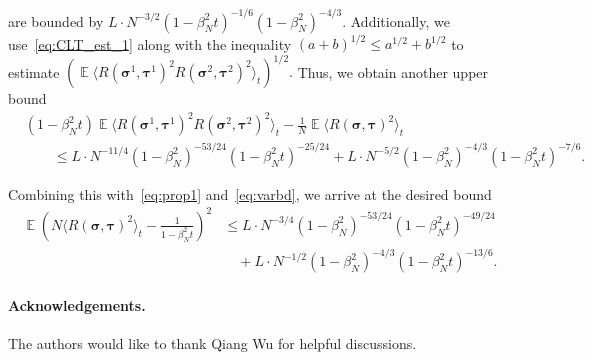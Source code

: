 \documentclass[letterpaper,11pt,reqno]{amsart}
\renewcommand{\leq}{\leqslant}
\newcommand{\ra}{\rangle}
\newcommand{\la}{\langle}
\newcommand{\mvgs}{\boldsymbol{\sigma}}\newcommand{\mvgS}{\boldsymbol{\Sigma}}\newcommand{\mvgt}{\boldsymbol{\tau}}
\DeclareMathOperator{\E}{\mathds{E}}
\begin{document}
are bounded by \(L \cdot N^{-3/2} (1-\beta_N^2 t)^{-1/6} (1-\beta_N^2)^{-4/3}\).
Additionally, we use~\eqref{eq:CLT_est_1} along with the inequality \((a+b)^{1/2} \leq a^{1/2} + b^{1/2}\) to estimate 
\(
\left(\E \la R(\mvgs^1, \mvgt^1)^2 R(\mvgs^2, \mvgt^2)^2  \ra_{t} \right)^{1/2}.
\)
Thus, we obtain another upper bound
\begin{align}
    &(1- \beta_N^2 t) \E \la R(\mvgs^1, \mvgt^1)^2 R(\mvgs^2, \mvgt^2)^2 \ra_{t} - \frac{1}{N} \E \la R(\mvgs, \mvgt)^2 \ra_{t}  \nonumber \\
    &\qquad\leq L \cdot N^{-11/4} (1-\beta_N^2)^{-53/24}(1-\beta_N^2 t)^{-25/24} + L \cdot N^{-5/2} (1-\beta_N^2)^{-4/3}(1-\beta_N^2 t)^{-7/6}. \label{eq:CLT_est_2}
\end{align}

Combining this with~\eqref{eq:prop1} and~\eqref{eq:varbd}, we arrive at the desired bound
\begin{align*}
    \E \left( N \la R(\mvgs, \mvgt)^2 \ra_{t} - \frac{1}{1-\beta_N^2 t} \right)^2
    &\leq L \cdot N^{-3/4} (1-\beta_N^2)^{-53/24}(1-\beta_N^2 t)^{-49/24} \\
    &\quad + L \cdot N^{-1/2} (1-\beta_N^2)^{-4/3}(1-\beta_N^2 t)^{-13/6}.
\end{align*}%

\paragraph{\bfseries Acknowledgements.} The authors would like to thank Qiang Wu for helpful discussions. 


 
\end{document}
